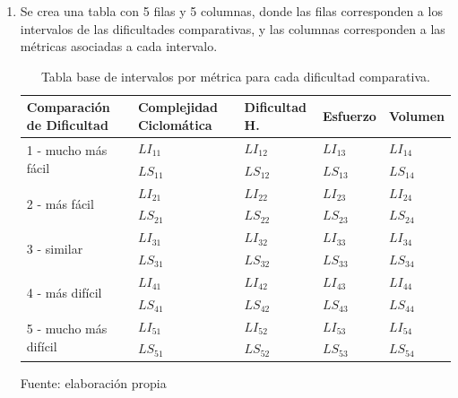 \documentclass[letterpaper,12pt]{article}
\begin{document}
\begin{enumerate}
  \item Se crea una tabla con 5 filas y 5 columnas, donde las filas corresponden a los intervalos de las dificultades comparativas, y las columnas corresponden a las métricas asociadas a cada intervalo.
        \begin{table}[H]
          \centering
          \begin{tabular}{|l|l|l|l|l|}
            \hline
            Comparación de Dificultad              & Complejidad Ciclomática & Dificultad H. & Esfuerzo  & Volumen   \\ \hline
            \multirow{2}{*}{1 - mucho más fácil}   & $LI_{11}$               & $LI_{12}$     & $LI_{13}$ & $LI_{14}$ \\ \cline{2-5}
                                                   & $LS_{11}$               & $LS_{12}$     & $LS_{13}$ & $LS_{14}$ \\ \hline
            \multirow{2}{*}{2 - más fácil}         & $LI_{21}$               & $LI_{22}$     & $LI_{23}$ & $LI_{24}$ \\ \cline{2-5}
                                                   & $LS_{21}$               & $LS_{22}$     & $LS_{23}$ & $LS_{24}$ \\ \hline
            \multirow{2}{*}{3 - similar}           & $LI_{31}$               & $LI_{32}$     & $LI_{33}$ & $LI_{34}$ \\ \cline{2-5}
                                                   & $LS_{31}$               & $LS_{32}$     & $LS_{33}$ & $LS_{34}$ \\ \hline
            \multirow{2}{*}{4 - más difícil}       & $LI_{41}$               & $LI_{42}$     & $LI_{43}$ & $LI_{44}$ \\ \cline{2-5}
                                                   & $LS_{41}$               & $LS_{42}$     & $LS_{43}$ & $LS_{44}$ \\ \hline
            \multirow{2}{*}{5 - mucho más difícil} & $LI_{51}$               & $LI_{52}$     & $LI_{53}$ & $LI_{54}$ \\ \cline{2-5}
                                                   & $LS_{51}$               & $LS_{52}$     & $LS_{53}$ & $LS_{54}$ \\ \hline
          \end{tabular}
          \caption{Tabla base de intervalos por métrica para cada dificultad comparativa.} Fuente: elaboración propia
          \label{tab:base-int-table}
        \end{table}


\end{enumerate}
\end{document}
